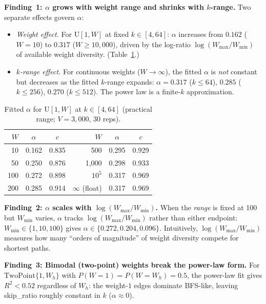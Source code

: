 \documentclass[conference]{IEEEtran}
\begin{document}
\noindent\textbf{Finding~1: $\alpha$ grows with weight range and
shrinks with $k$-range.}
Two separate effects govern $\alpha$:
\begin{itemize}
  \item \emph{Weight effect.}
    For $\mathrm{U}[1,W]$ at fixed $k\in[4,64]$:
    $\alpha$ increases from $0.162$ ($W=10$) to
    $0.317$ ($W\geq 10{,}000$), driven by the log-ratio
    $\log(W_{\max}/W_{\min})$ of available weight diversity.
    (Table~\ref{tab:alpha_vs_W}.)
  \item \emph{$k$-range effect.}
    For continuous weights ($W\to\infty$), the fitted $\alpha$ is
    \emph{not} constant but decreases as the fitted $k$-range expands:
    $\alpha=0.317$ ($k\leq 64$), $0.285$ ($k\leq 256$), $0.270$ ($k\leq 512$).
    The power law is a finite-$k$ approximation.
\end{itemize}

\begin{table}[h]
\centering
\caption{Fitted $\alpha$ for $\mathrm{U}[1,W]$ at $k\in[4,64]$
(practical range; $V=3{,}000$, 30 reps).}
\label{tab:alpha_vs_W}
\small
\begin{tabular}{rcc|rcc}
\toprule
$W$ & $\alpha$ & $c$ & $W$ & $\alpha$ & $c$ \\
\midrule
  10 & 0.162 & 0.835 &   500 & 0.295 & 0.929 \\
  50 & 0.250 & 0.876 & 1{,}000 & 0.298 & 0.933 \\
 100 & 0.272 & 0.898 & $10^5$ & 0.317 & 0.969 \\
 200 & 0.285 & 0.914 & $\infty$ (float) & 0.317 & 0.969 \\
\bottomrule
\end{tabular}
\end{table}

\noindent\textbf{Finding~2: $\alpha$ scales with $\log(W_{\max}/W_{\min})$.}
When the \emph{range} is fixed at 100 but $W_{\min}$ varies,
$\alpha$ tracks $\log(W_{\max}/W_{\min})$ rather than either endpoint:
$W_{\min}\!\in\!\{1,10,100\}$ gives $\alpha\!\in\!\{0.272,0.204,0.096\}$.
Intuitively, $\log(W_{\max}/W_{\min})$ measures how many ``orders of
magnitude'' of weight diversity compete for shortest paths.

\noindent\textbf{Finding~3: Bimodal (two-point) weights break
the power-law form.}
For $\mathrm{TwoPoint}\{1,W_h\}$ with $P(W=1)=P(W=W_h)=0.5$,
the power-law fit gives $R^2<0.52$ regardless of $W_h$: the
weight-$1$ edges dominate BFS-like, leaving skip\_ratio roughly
constant in $k$ ($\alpha\approx 0$).
\end{document}
